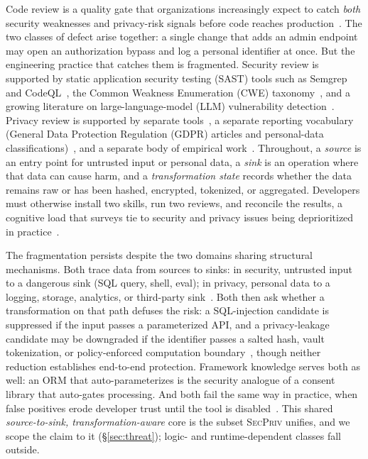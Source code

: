 \documentclass[runningheads]{llncs}
\begin{document}
Code review is a quality gate that organizations increasingly expect to catch \emph{both} security weaknesses and privacy-risk signals before code reaches production~\cite{braz2022sw_security,charoenwet2024toward}. The two classes of defect arise together: a single change that adds an admin endpoint may open an authorization bypass and log a personal identifier at once. But the engineering practice that catches them is fragmented. Security review is supported by static application security testing (SAST) tools such as Semgrep and CodeQL~\cite{semgrep2023,avgustinov2016ql,codeql2024}, the Common Weakness Enumeration (CWE) taxonomy~\cite{cwe2024}, and a growing literature on large-language-model (LLM) vulnerability detection~\cite{ding2024vulnerability,beljulji2025llmscr,li2018vuldeepecker,zhou2025large}. Privacy review is supported by separate tools~\cite{tang2023privacydata,arzt2014flowdroid,privado2024}, a separate reporting vocabulary (General Data Protection Regulation (GDPR) articles and personal-data classifications)~\cite{gdpr2016}, and a separate body of empirical work~\cite{theophilou2026privacy_survey,fugkeaw2021ap2i}. Throughout, a \emph{source} is an entry point for untrusted input or personal data, a \emph{sink} is an operation where that data can cause harm, and a \emph{transformation state} records whether the data remains raw or has been hashed, encrypted, tokenized, or aggregated. Developers must otherwise install two skills, run two reviews, and reconcile the results, a cognitive load that surveys tie to security and privacy issues being deprioritized in practice~\cite{braz2022sw_security,theophilou2026privacy_survey,george2025skillsgap}.

The fragmentation persists despite the two domains sharing structural mechanisms. Both trace data from sources to sinks: in security, untrusted input to a dangerous sink (SQL query, shell, eval); in privacy, personal data to a logging, storage, analytics, or third-party sink~\cite{tang2023privacydata}. Both then ask whether a transformation on that path defuses the risk: a SQL-injection candidate is suppressed if the input passes a parameterized API, and a privacy-leakage candidate may be downgraded if the identifier passes a salted hash, vault tokenization, or policy-enforced computation boundary~\cite{wang2023dpi,zhao2026styx}, though neither reduction establishes end-to-end protection. Framework knowledge serves both as well: an ORM that auto-parameterizes is the security analogue of a consent library that auto-gates processing. And both fail the same way in practice, when false positives erode developer trust until the tool is disabled~\cite{johnson2013why,christakis2016developers,beljulji2025llmscr}. This shared \emph{source-to-sink, transformation-aware} core is the subset \textsc{SecPriv} unifies, and we scope the claim to it (\S\ref{sec:threat}); logic- and runtime-dependent classes fall outside.
\end{document}
